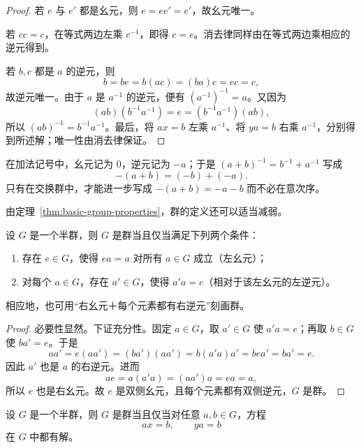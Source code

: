 \begin{proof}
若 $e$ 与 $e'$ 都是幺元，则 $e=ee'=e'$，故幺元唯一。

若 $cc=c$，在等式两边左乘 $c^{-1}$，即得 $c=e$。消去律同样由在等式两边乘相应的逆元得到。

若 $b,c$ 都是 $a$ 的逆元，则
\[
  b=be=b(ac)=(ba)c=ec=c,
\]
故逆元唯一。由于 $a$ 是 $a^{-1}$ 的逆元，便有 $(a^{-1})^{-1}=a$。又因为
\[
  (ab)(b^{-1}a^{-1})=e=(b^{-1}a^{-1})(ab),
\]
所以 $(ab)^{-1}=b^{-1}a^{-1}$。最后，将 $ax=b$ 左乘 $a^{-1}$、将 $ya=b$ 右乘 $a^{-1}$，分别得到所述解；唯一性由消去律保证。
\end{proof}

\begin{purplenote}
在加法记号中，幺元记为 $0$，逆元记为 $-a$；于是 $(a+b)^{-1}=b^{-1}+a^{-1}$ 写成
\[
  -(a+b)=(-b)+(-a).
\]
只有在交换群中，才能进一步写成 $-(a+b)=-a-b$ 而不必在意次序。
\end{purplenote}

由定理~\ref{thm:basic-group-properties}，群的定义还可以适当减弱。

\begin{proposition}\label{prop:left-group-axioms}
设 $G$ 是一个半群，则 $G$ 是群当且仅当满足下列两个条件：
\begin{enumerate}[label=(\arabic*)]
  \item 存在 $e\in G$，使得 $ea=a$ 对所有 $a\in G$ 成立（左幺元）；
  \item 对每个 $a\in G$，存在 $a'\in G$，使得 $a'a=e$（相对于该左幺元的左逆元）。
\end{enumerate}
\end{proposition}

\begin{purplenote}
相应地，也可用“右幺元＋每个元素都有右逆元”刻画群。
\end{purplenote}

\begin{proof}
必要性显然。下证充分性。固定 $a\in G$，取 $a'\in G$ 使 $a'a=e$；再取 $b\in G$ 使 $ba'=e$。于是
\[
  aa'=e(aa')=(ba')(aa')=b(a'a)a'=bea'=ba'=e.
\]
因此 $a'$ 也是 $a$ 的右逆元。进而
\[
  ae=a(a'a)=(aa')a=ea=a,
\]
所以 $e$ 也是右幺元。故 $e$ 是双侧幺元，且每个元素都有双侧逆元，$G$ 是群。
\end{proof}

\begin{proposition}\label{prop:solvability-group}
设 $G$ 是一个半群，则 $G$ 是群当且仅当对任意 $a,b\in G$，方程
\[
  ax=b,\qquad ya=b
\]
在 $G$ 中都有解。
\end{proposition}

